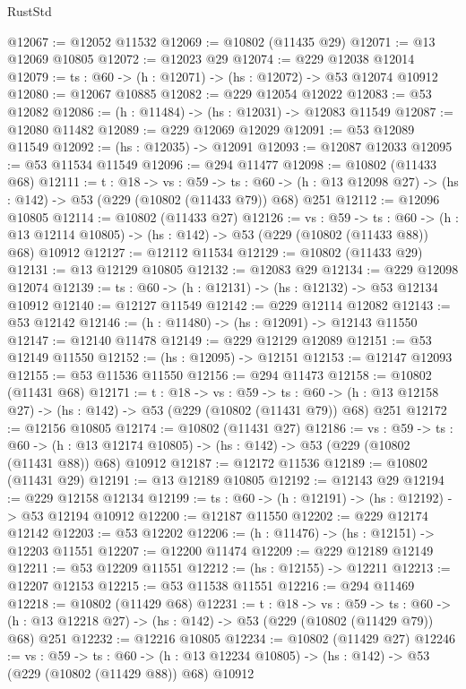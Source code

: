\begin{lexlean}{RustStd}
\begin{coremodule}
@12067 := @12052 @11532
@12069 := @10802 (@11435 @29)
@12071 := @13 @12069 @10805
@12072 := @12023 @29
@12074 := @229 @12038 @12014
@12079 := {ts : @60} -> (h : @12071) -> (hs : @12072) -> @53 @12074 @10912
@12080 := @12067 @10885
@12082 := @229 @12054 @12022
@12083 := @53 @12082
@12086 := (h : @11484) -> (hs : @12031) -> @12083 @11549
@12087 := @12080 @11482
@12089 := @229 @12069 @12029
@12091 := @53 @12089 @11549
@12092 := (hs : @12035) -> @12091
@12093 := @12087 @12033
@12095 := @53 @11534 @11549
@12096 := @294 @11477
@12098 := @10802 (@11433 @68)
@12111 := {t : @18} ->
  {vs : @59} ->
  {ts : @60} -> (h : @13 @12098 @27) -> (hs : @142) -> @53 (@229 (@10802 (@11433 @79)) @68) @251
@12112 := @12096 @10805
@12114 := @10802 (@11433 @27)
@12126 := {vs : @59} ->
  {ts : @60} ->
  (h : @13 @12114 @10805) -> (hs : @142) -> @53 (@229 (@10802 (@11433 @88)) @68) @10912
@12127 := @12112 @11534
@12129 := @10802 (@11433 @29)
@12131 := @13 @12129 @10805
@12132 := @12083 @29
@12134 := @229 @12098 @12074
@12139 := {ts : @60} -> (h : @12131) -> (hs : @12132) -> @53 @12134 @10912
@12140 := @12127 @11549
@12142 := @229 @12114 @12082
@12143 := @53 @12142
@12146 := (h : @11480) -> (hs : @12091) -> @12143 @11550
@12147 := @12140 @11478
@12149 := @229 @12129 @12089
@12151 := @53 @12149 @11550
@12152 := (hs : @12095) -> @12151
@12153 := @12147 @12093
@12155 := @53 @11536 @11550
@12156 := @294 @11473
@12158 := @10802 (@11431 @68)
@12171 := {t : @18} ->
  {vs : @59} ->
  {ts : @60} -> (h : @13 @12158 @27) -> (hs : @142) -> @53 (@229 (@10802 (@11431 @79)) @68) @251
@12172 := @12156 @10805
@12174 := @10802 (@11431 @27)
@12186 := {vs : @59} ->
  {ts : @60} ->
  (h : @13 @12174 @10805) -> (hs : @142) -> @53 (@229 (@10802 (@11431 @88)) @68) @10912
@12187 := @12172 @11536
@12189 := @10802 (@11431 @29)
@12191 := @13 @12189 @10805
@12192 := @12143 @29
@12194 := @229 @12158 @12134
@12199 := {ts : @60} -> (h : @12191) -> (hs : @12192) -> @53 @12194 @10912
@12200 := @12187 @11550
@12202 := @229 @12174 @12142
@12203 := @53 @12202
@12206 := (h : @11476) -> (hs : @12151) -> @12203 @11551
@12207 := @12200 @11474
@12209 := @229 @12189 @12149
@12211 := @53 @12209 @11551
@12212 := (hs : @12155) -> @12211
@12213 := @12207 @12153
@12215 := @53 @11538 @11551
@12216 := @294 @11469
@12218 := @10802 (@11429 @68)
@12231 := {t : @18} ->
  {vs : @59} ->
  {ts : @60} -> (h : @13 @12218 @27) -> (hs : @142) -> @53 (@229 (@10802 (@11429 @79)) @68) @251
@12232 := @12216 @10805
@12234 := @10802 (@11429 @27)
@12246 := {vs : @59} ->
  {ts : @60} ->
  (h : @13 @12234 @10805) -> (hs : @142) -> @53 (@229 (@10802 (@11429 @88)) @68) @10912

\end{coremodule}
\end{lexlean}
